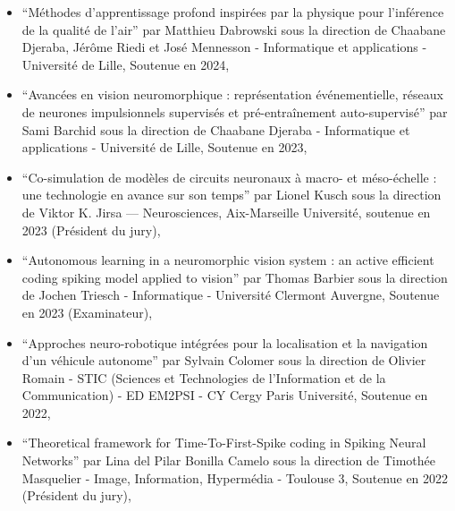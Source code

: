 \documentclass[10pt,french,a4paper,twoside]{article}%
\begin{document}
\begin{itemize}



    \item ``Méthodes d'apprentissage profond inspirées par la physique pour l'inférence de la qualité de l'air'' par Matthieu Dabrowski sous la direction de Chaabane Djeraba, Jérôme Riedi et José Mennesson - Informatique et applications - Université de Lille, Soutenue en 2024,

    \item ``Avancées en vision neuromorphique : représentation événementielle, réseaux de neurones impulsionnels supervisés et pré-entraînement auto-supervisé'' par Sami Barchid sous la direction de Chaabane Djeraba - Informatique et applications - Université de Lille, Soutenue en 2023,

    \item ``Co-simulation de modèles de circuits neuronaux à macro- et méso-échelle : une technologie en avance sur son temps'' par Lionel Kusch sous la direction de Viktor K. Jirsa --- Neurosciences, Aix-Marseille Université, soutenue en 2023 (Président du jury),

    \item ``Autonomous learning in a neuromorphic vision system : an active efficient coding spiking model applied to vision'' par Thomas Barbier sous la direction de Jochen Triesch - Informatique - Université Clermont Auvergne, Soutenue en 2023  (Examinateur),

    \item ``Approches neuro-robotique intégrées pour la localisation et la navigation d'un véhicule autonome'' par Sylvain Colomer sous la direction de Olivier Romain - STIC (Sciences et Technologies de l'Information et de la Communication) - ED EM2PSI - CY Cergy Paris Université, Soutenue en 2022,

    \item ``Theoretical framework for Time-To-First-Spike coding in Spiking Neural Networks'' par Lina del Pilar Bonilla Camelo sous la direction de Timothée Masquelier - Image, Information, Hypermédia - Toulouse 3, Soutenue en 2022 (Président du jury),


\end{itemize}
\end{document}
